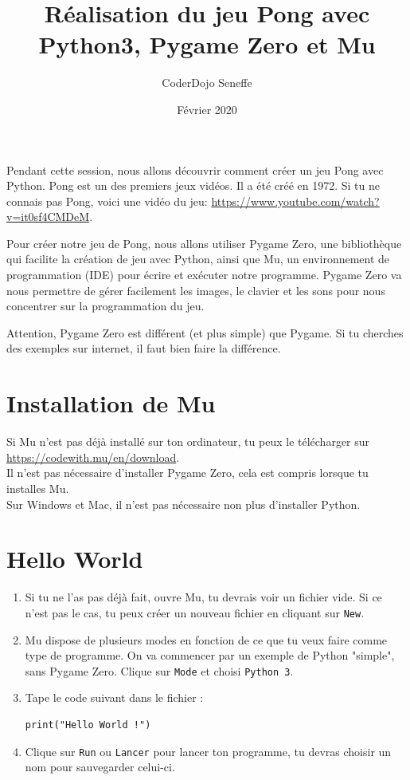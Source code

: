 \documentclass[11pt]{article}
\author{CoderDojo Seneffe}
\title{Réalisation du jeu Pong avec Python3, Pygame Zero et Mu}
\date{Février 2020}
\newcommand{\trad}[1]{\marginnote{\textcolor{deepblue}{#1}}}
\begin{document}
\maketitle

Pendant cette session,\trad{\RaggedRight Retrouve les traductions anglais~$\rightarrow$~français dans cette marge.}
nous allons découvrir comment créer un jeu Pong avec Python.
Pong est un des premiers jeux vidéos. Il a été créé en 1972.
Si tu ne connais pas Pong, voici une vidéo du jeu: \url{https://www.youtube.com/watch?v=it0sf4CMDeM}.

Pour créer notre jeu de Pong, nous allons utiliser Pygame Zero, une bibliothèque qui facilite la création de jeu avec Python,
ainsi que Mu, un environnement de programmation (IDE) pour écrire et exécuter notre programme.
Pygame Zero va nous permettre de gérer facilement les images, le clavier et les sons pour nous concentrer sur la programmation du jeu.

Attention, Pygame Zero est différent (et plus simple) que Pygame. Si tu cherches des exemples sur internet, il faut bien faire la différence.

\section{Installation de Mu}

Si Mu n'est pas déjà installé sur ton ordinateur, tu peux le télécharger sur \url{https://codewith.mu/en/download}.\\
Il n'est pas nécessaire d'installer Pygame Zero, cela est compris lorsque tu installes Mu.\\
Sur Windows et Mac, il n'est pas nécessaire non plus d'installer Python.

\section{Hello World}

\begin{enumerate}
    \item Si tu ne l'as pas déjà fait, ouvre Mu, tu devrais voir un fichier vide. Si ce n'est pas le cas, tu peux créer un nouveau fichier en cliquant sur \texttt{New}.
    
    \item Mu dispose de plusieurs modes en fonction de ce que tu veux faire comme type de programme. On va commencer par un exemple de Python "simple", sans Pygame Zero. Clique sur \texttt{Mode} et choisi \texttt{Python 3}.

    \item Tape le code suivant dans le fichier :
\begin{lstlisting}
print("Hello World !")
\end{lstlisting}

    \item Clique sur \texttt{Run} ou \texttt{Lancer} pour lancer ton programme, tu devras choisir un nom pour sauvegarder celui-ci.
\end{enumerate}
\end{document}
